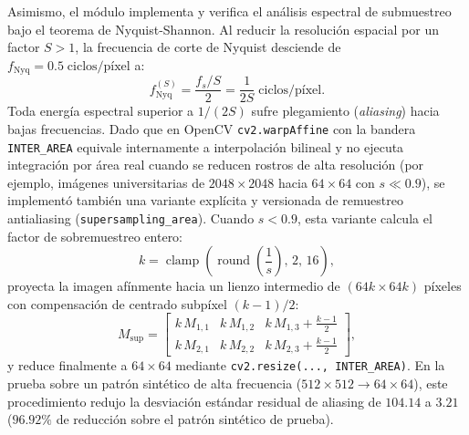 \documentclass{article}
\begin{document}
Asimismo, el módulo implementa y verifica el análisis espectral de submuestreo bajo el teorema de Nyquist-Shannon. Al reducir la resolución espacial por un factor $S > 1$, la frecuencia de corte de Nyquist desciende de $f_{\text{Nyq}} = 0.5\;\text{ciclos/píxel}$ a:
\begin{equation}
f_{\text{Nyq}}^{(S)} = \frac{f_s / S}{2} = \frac{1}{2S}\;\text{ciclos/píxel}.
\label{eq:nyquist_submuestreo}
\end{equation}
Toda energía espectral superior a $1/(2S)$ sufre plegamiento (\textit{aliasing}) hacia bajas frecuencias. Dado que en OpenCV \texttt{cv2.warpAffine} con la bandera \texttt{INTER\_AREA} equivale internamente a interpolación bilineal y no ejecuta integración por área real cuando se reducen rostros de alta resolución (por ejemplo, imágenes universitarias de $2048 \times 2048$ hacia $64 \times 64$ con $s \ll 0.9$), se implementó también una variante explícita y versionada de remuestreo antialiasing (\texttt{supersampling\_area}). Cuando $s < 0.9$, esta variante calcula el factor de sobremuestreo entero:
\begin{equation}
k = \operatorname{clamp}\!\left(\operatorname{round}\!\left(\frac{1}{s}\right),\, 2,\, 16\right),
\label{eq:factor_sobremuestreo}
\end{equation}
proyecta la imagen afínmente hacia un lienzo intermedio de $(64k \times 64k)$ píxeles con compensación de centrado subpíxel $(k-1)/2$:
\begin{equation}
M_{\text{sup}} = \begin{bmatrix} k\,M_{1,1} & k\,M_{1,2} & k\,M_{1,3} + \frac{k-1}{2} \\ k\,M_{2,1} & k\,M_{2,2} & k\,M_{2,3} + \frac{k-1}{2} \end{bmatrix},
\label{eq:matriz_sobremuestreo}
\end{equation}
y reduce finalmente a $64 \times 64$ mediante \texttt{cv2.resize(..., INTER\_AREA)}. En la prueba sobre un patrón sintético de alta frecuencia ($512 \times 512 \to 64 \times 64$), este procedimiento redujo la desviación estándar residual de aliasing de $104.14$ a $3.21$ ($96.92\%$ de reducción sobre el patrón sintético de prueba).
\end{document}
